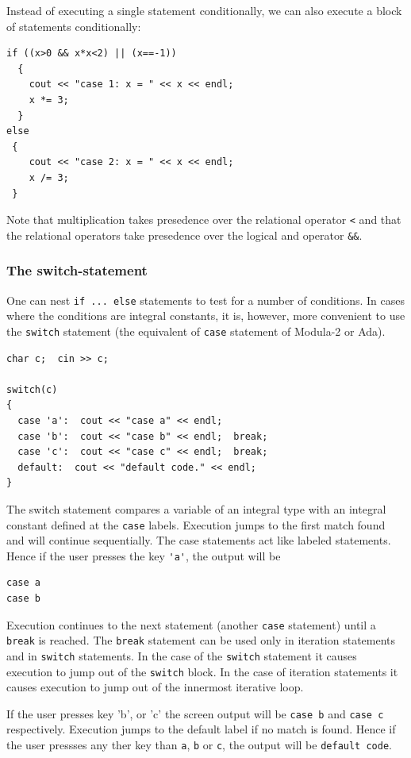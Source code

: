 Instead of executing a single statement conditionally, we can also execute a
block of statements conditionally:
{\small \begin{verbatim}
if ((x>0 && x*x<2) || (x==-1))
  {
    cout << "case 1: x = " << x << endl;
    x *= 3;
  }
else
 {
    cout << "case 2: x = " << x << endl;
    x /= 3;
 }
\end{verbatim}}
\noindent
Note that multiplication takes presedence over the relational operator \verb+<+
and that the relational operators take presedence over the logical and operator
\verb+&&+.

\subsubsection{The switch-statement}

One can nest \verb+if ... else+ statements to test for a number of conditions. In
cases where the conditions are integral constants, it is, however, more convenient
to use the \verb+switch+ statement (the equivalent of \verb+case+ statement of
Modula-2 or Ada).
{\small \begin{verbatim}
char c;  cin >> c;

switch(c)
{
  case 'a':  cout << "case a" << endl;
  case 'b':  cout << "case b" << endl;  break;
  case 'c':  cout << "case c" << endl;  break;
  default:  cout << "default code." << endl;
}
\end{verbatim}}
\noindent
The switch statement compares a variable of an integral type with an integral
constant defined at the \verb+case+ labels. Execution jumps to the first match found
and will continue sequentially. The case statements act like labeled statements.
Hence if the user presses the key \verb+'a'+, the output will be
{\small \begin{verbatim}
case a
case b
\end{verbatim}}
\noindent
Execution continues to the next statement (another \verb+case+ statement) until
a \verb+break+ is reached. The \verb+break+ statement can be used only in iteration
statements and in \verb+switch+ statements. In the case of the \verb+switch+ statement
it causes execution to jump out of the \verb+switch+ block. In the case of iteration
statements it causes execution to jump out of the innermost iterative loop.

If the user presses key 'b', or 'c' the screen output will be \verb+case b+ and
\verb+case c+ respectively. Execution jumps to the default label if no match
is found. Hence if the user pressses any ther key than \verb+a+,  \verb+b+ or
\verb+c+, the output will be \verb+default code+.


